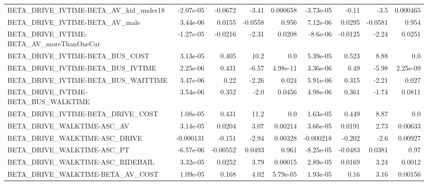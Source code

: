 \begin{tabular}{lrrrrrrrr}
BETA\_DRIVE\_IVTIME-BETA\_AV\_kid\_under18              &   -2.07e-05 &      -0.0672 &     -3.41 & 0.000658 &  -3.73e-05 &       -0.11 &         -3.5 &      0.000465 \\
BETA\_DRIVE\_IVTIME-BETA\_AV\_male                     &    3.44e-06 &       0.0155 &   -0.0558 &    0.956 &   7.12e-06 &      0.0295 &      -0.0581 &         0.954 \\
BETA\_DRIVE\_IVTIME-BETA\_AV\_moreThanOneCar           &   -1.27e-05 &      -0.0216 &     -2.31 &   0.0208 &   -8.6e-06 &     -0.0125 &        -2.24 &        0.0251 \\
BETA\_DRIVE\_IVTIME-BETA\_BUS\_COST                    &    3.13e-05 &        0.405 &      10.2 &      0.0 &   5.39e-05 &       0.523 &         8.88 &           0.0 \\
BETA\_DRIVE\_IVTIME-BETA\_BUS\_IVTIME                  &    2.25e-06 &        0.431 &     -6.57 & 4.98e-11 &   3.36e-06 &        0.49 &        -5.98 &      2.25e-09 \\
BETA\_DRIVE\_IVTIME-BETA\_BUS\_WAITTIME                &    3.47e-06 &         0.22 &     -2.26 &    0.024 &   5.91e-06 &       0.315 &        -2.21 &         0.027 \\
BETA\_DRIVE\_IVTIME-BETA\_BUS\_WALKTIME                &    3.54e-06 &        0.352 &      -2.0 &   0.0456 &   4.98e-06 &       0.361 &        -1.74 &        0.0811 \\
BETA\_DRIVE\_IVTIME-BETA\_DRIVE\_COST                  &    1.08e-05 &        0.431 &      11.2 &      0.0 &   1.63e-05 &       0.449 &         8.87 &           0.0 \\
BETA\_DRIVE\_WALKTIME-ASC\_AV                         &    3.14e-05 &       0.0204 &      3.07 &  0.00214 &   3.66e-05 &      0.0191 &         2.73 &       0.00633 \\
BETA\_DRIVE\_WALKTIME-ASC\_DRIVE                      &   -0.000131 &       -0.151 &     -2.94 &  0.00328 &  -0.000218 &      -0.202 &         -2.6 &       0.00927 \\
BETA\_DRIVE\_WALKTIME-ASC\_PT                         &   -6.57e-06 &     -0.00552 &    0.0493 &    0.961 &  -8.25e-05 &     -0.0483 &       0.0381 &          0.97 \\
BETA\_DRIVE\_WALKTIME-ASC\_RIDEHAIL                   &    3.32e-05 &       0.0252 &      3.79 &  0.00015 &   2.89e-05 &      0.0169 &         3.24 &        0.0012 \\
BETA\_DRIVE\_WALKTIME-BETA\_AV\_COST                   &    1.09e-05 &        0.168 &      4.02 & 5.79e-05 &   1.93e-05 &        0.16 &         3.16 &       0.00156 \\

\end{tabular}
